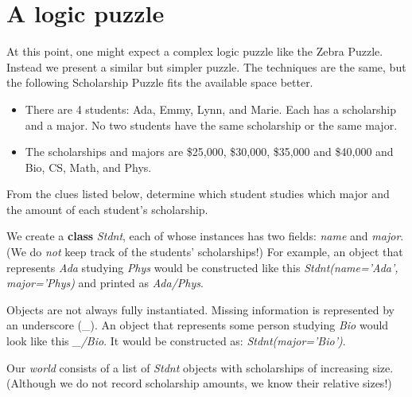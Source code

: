 \section{A logic puzzle}\label{sec:zebra}

At this point, one might expect a complex logic puzzle like the Zebra Puzzle\cite{ZebraPuzzle}. Instead we present a similar but simpler puzzle. The techniques are the same, but the following Scholarship Puzzle\cite{ScholarshipPuzzle} fits the available space better. 

\largev
\begin{itemize}
    \item There are 4 students: Ada, Emmy, Lynn, and Marie. Each has a scholarship and a major.  No two students have the same scholarship or the same major. 
    
    \item The scholarships and majors are \$25,000, \$30,000, \$35,000 and \$40,000 and Bio, CS, Math, and Phys. 

\end{itemize}

From the clues listed below, determine which student studies which major and the amount of each student's scholarship.

\largev
We create a \textbf{class} \textit{Stdnt}, each of whose instances has two fields: \textit{name} and \textit{major}. (We do \textit{not} keep track of the students' scholarships!) For example, an object that represents \textit{Ada} studying \textit{Phys} would be constructed like this \textit{Stdnt(name='Ada', major='Phys)} and printed as \textit{Ada/Phys}. 

Objects are not always fully instantiated. Missing information is represented by an underscore (\_). An object that represents some person studying \textit{Bio} would look like this \textit{\_/Bio}. It would be constructed as: \textit{Stdnt(major='Bio')}.

Our \textit{world} consists of a list of \textit{Stdnt} objects with scholarships of increasing size. (Although we do not record scholarship amounts, we know their relative sizes!)

